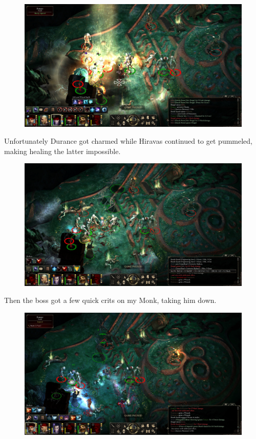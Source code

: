 \documentclass{article}
\begin{document}
\begin{figure}
\includegraphics[scale=0.33]{files/blog/2018_11_25_pillars_of_eternity_path_of_the_damned_act_ii/2018_11_25_fampyr05.jpg}
\end{figure}

Unfortunately Durance got charmed while Hiravas continued to get pummeled, making healing the latter impossible.

\begin{figure}
\includegraphics[scale=0.33]{files/blog/2018_11_25_pillars_of_eternity_path_of_the_damned_act_ii/2018_11_25_fampyr06.jpg}
\end{figure}

Then the boss got a few quick crits on my Monk, taking him down.

\begin{figure}
\includegraphics[scale=0.33]{files/blog/2018_11_25_pillars_of_eternity_path_of_the_damned_act_ii/2018_11_25_fampyr07.jpg}
\end{figure}
\end{document}
